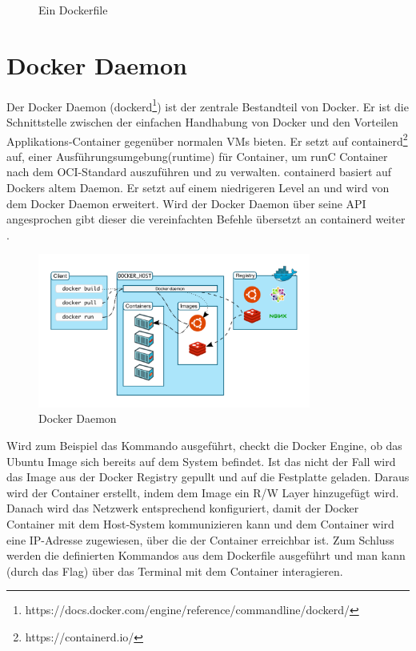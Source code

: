 \begin{figure}[!ht]
  \centering
  \caption{Ein Dockerfile}\label{figure:Dockerfile}
\end{figure}


\section{Docker Daemon}

Der Docker Daemon (dockerd\footnote{https://docs.docker.com/engine/reference/commandline/dockerd/}) ist der zentrale Bestandteil von Docker. Er ist die Schnittstelle zwischen der einfachen Handhabung von Docker und den Vorteilen Applikations-Container gegenüber normalen VMs bieten. Er setzt auf containerd\footnote{https://containerd.io/} auf, einer Ausführungsumgebung(runtime) für Container, um runC Container nach dem OCI-Standard auszuführen und zu verwalten. containerd basiert auf Dockers altem Daemon. Er setzt auf einem niedrigeren Level an und wird von dem Docker Daemon erweitert. Wird der Docker Daemon über seine API angesprochen gibt dieser die vereinfachten Befehle übersetzt an containerd weiter \cite{docker:daemon}.\\

\begin{figure}[!ht]
  \centering
  \includegraphics[width=0.8\textwidth]{images/12-docker-daemon.png}
  \caption{Docker Daemon\cite{docker:ud}}
\end{figure}

\noindent Wird zum Beispiel das Kommando  ausgeführt, checkt die Docker Engine, ob das Ubuntu Image sich bereits auf dem System befindet. Ist das nicht der Fall wird das Image aus der Docker Registry gepullt und auf die Festplatte geladen. Daraus wird der Container erstellt, indem dem Image ein R/W Layer hinzugefügt wird. Danach wird das Netzwerk entsprechend konfiguriert, damit der Docker Container mit dem Host-System kommunizieren kann und dem Container wird eine IP-Adresse zugewiesen, über die der Container erreichbar ist. Zum Schluss werden die definierten Kommandos aus dem Dockerfile ausgeführt und man kann (durch das  Flag) über das Terminal mit dem Container interagieren.

